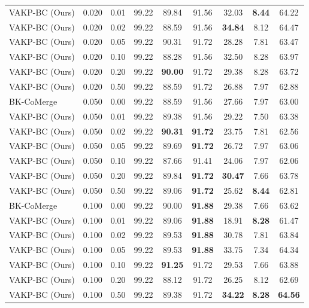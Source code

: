 \documentclass{article}
\theoremstyle{plain}
\theoremstyle{definition}
\theoremstyle{remark}
\begin{document}
\begin{table}[t]
\begin{tabular}{lcccccccc}
VAKP-BC (Ours) & 0.020 & 0.01 & 99.22 & 89.84 & 91.56 & 32.03 & \textbf{8.44} & 64.22 \\
VAKP-BC (Ours) & 0.020 & 0.02 & 99.22 & 88.59 & 91.56 & \textbf{34.84} & 8.12 & 64.47 \\
VAKP-BC (Ours) & 0.020 & 0.05 & 99.22 & 90.31 & 91.72 & 28.28 & 7.81 & 63.47 \\
VAKP-BC (Ours) & 0.020 & 0.10 & 99.22 & 88.28 & 91.56 & 32.50 & 8.28 & 63.97 \\
VAKP-BC (Ours) & 0.020 & 0.20 & 99.22 & \textbf{90.00} & 91.72 & 29.38 & 8.28 & 63.72 \\
VAKP-BC (Ours) & 0.020 & 0.50 & 99.22 & 88.59 & 91.72 & 26.88 & 7.97 & 62.88 \\
\midrule
BK-CoMerge & 0.050 & 0.00 & 99.22 & 88.59 & 91.56 & 27.66 & 7.97 & 63.00 \\
VAKP-BC (Ours) & 0.050 & 0.01 & 99.22 & 89.38 & 91.56 & 29.22 & 7.50 & 63.38 \\
VAKP-BC (Ours) & 0.050 & 0.02 & 99.22 & \textbf{90.31} & \textbf{91.72} & 23.75 & 7.81 & 62.56 \\
VAKP-BC (Ours) & 0.050 & 0.05 & 99.22 & 89.69 & \textbf{91.72} & 26.72 & 7.97 & 63.06 \\
VAKP-BC (Ours) & 0.050 & 0.10 & 99.22 & 87.66 & 91.41 & 24.06 & 7.97 & 62.06 \\
VAKP-BC (Ours) & 0.050 & 0.20 & 99.22 & 89.84 & \textbf{91.72} & \textbf{30.47} & 7.66 & 63.78 \\
VAKP-BC (Ours) & 0.050 & 0.50 & 99.22 & 89.06 & \textbf{91.72} & 25.62 & \textbf{8.44} & 62.81 \\
\midrule
BK-CoMerge & 0.100 & 0.00 & 99.22 & 90.00 & \textbf{91.88} & 29.38 & 7.66 & 63.62 \\
VAKP-BC (Ours) & 0.100 & 0.01 & 99.22 & 89.06 & \textbf{91.88} & 18.91 & \textbf{8.28} & 61.47 \\
VAKP-BC (Ours) & 0.100 & 0.02 & 99.22 & 89.53 & \textbf{91.88} & 30.78 & 7.81 & 63.84 \\
VAKP-BC (Ours) & 0.100 & 0.05 & 99.22 & 89.53 & \textbf{91.88} & 33.75 & 7.34 & 64.34 \\
VAKP-BC (Ours) & 0.100 & 0.10 & 99.22 & \textbf{91.25} & 91.72 & 29.53 & 7.66 & 63.88 \\
VAKP-BC (Ours) & 0.100 & 0.20 & 99.22 & 88.12 & 91.72 & 26.25 & 8.12 & 62.69 \\
VAKP-BC (Ours) & 0.100 & 0.50 & 99.22 & 89.38 & 91.72 & \textbf{34.22} & \textbf{8.28} & \textbf{64.56} \\
\bottomrule
\end{tabular}
\end{table}
\end{document}
